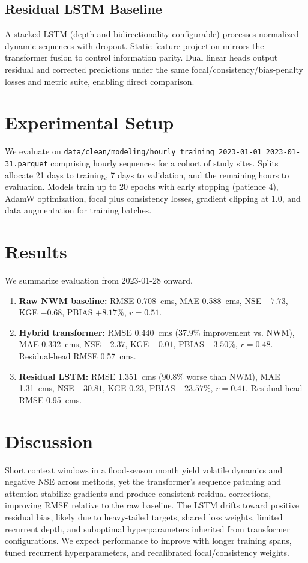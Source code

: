 \documentclass[draft]{agujournal2019}
\begin{document}
\subsection{Residual LSTM Baseline}
A stacked LSTM (depth and bidirectionality configurable) processes normalized dynamic sequences with dropout. Static-feature projection mirrors the transformer fusion to control information parity. Dual linear heads output residual and corrected predictions under the same focal/consistency/bias-penalty losses and metric suite, enabling direct comparison.

\section{Experimental Setup}
We evaluate on \texttt{data/clean/modeling/hourly\_training\_2023-01-01\_2023-01-31.parquet} comprising hourly sequences for a cohort of study sites. Splits allocate 21 days to training, 7 days to validation, and the remaining hours to evaluation. Models train up to 20 epochs with early stopping (patience 4), AdamW optimization, focal plus consistency losses, gradient clipping at 1.0, and data augmentation for training batches.

\section{Results}
We summarize evaluation from 2023-01-28 onward.
\begin{enumerate}
\item \textbf{Raw NWM baseline:} RMSE 0.708~cms, MAE 0.588~cms, NSE $-7.73$, KGE $-0.68$, PBIAS $+8.17\%$, $r=0.51$.
\item \textbf{Hybrid transformer:} RMSE 0.440~cms (37.9\% improvement vs. NWM), MAE 0.332~cms, NSE $-2.37$, KGE $-0.01$, PBIAS $-3.50\%$, $r=0.48$. Residual-head RMSE 0.57~cms.
\item \textbf{Residual LSTM:} RMSE 1.351~cms (90.8\% worse than NWM), MAE 1.31~cms, NSE $-30.81$, KGE $0.23$, PBIAS $+23.57\%$, $r=0.41$. Residual-head RMSE 0.95~cms.
\end{enumerate}

\section{Discussion}
Short context windows in a flood-season month yield volatile dynamics and negative NSE across methods, yet the transformer’s sequence patching and attention stabilize gradients and produce consistent residual corrections, improving RMSE relative to the raw baseline. The LSTM drifts toward positive residual bias, likely due to heavy-tailed targets, shared loss weights, limited recurrent depth, and suboptimal hyperparameters inherited from transformer configurations. We expect performance to improve with longer training spans, tuned recurrent hyperparameters, and recalibrated focal/consistency weights.
\end{document}
